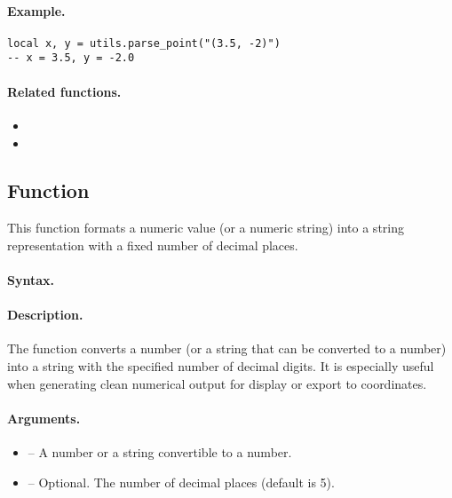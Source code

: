 \paragraph{Example.}
\begin{verbatim}
local x, y = utils.parse_point("(3.5, -2)")
-- x = 3.5, y = -2.0
\end{verbatim}

\paragraph{Related functions.}
\begin{itemize}
\item {}
\item {}
\end{itemize}

\subsection{Function }
\label{sub:function_utils_format_number}

This function formats a numeric value (or a numeric string) into a string representation with a fixed number of decimal places.

\paragraph{Syntax.}
\begin{center}
\end{center}

\paragraph{Description.}
The function converts a number (or a string that can be converted to a number) into a string with the specified number of decimal digits. It is especially useful when generating clean numerical output for display or export to \TIKZ{} coordinates.

\paragraph{Arguments.}
\begin{itemize}
\item {} – A number or a string convertible to a number.
\item {} – Optional. The number of decimal places (default is 5).
\end{itemize}

